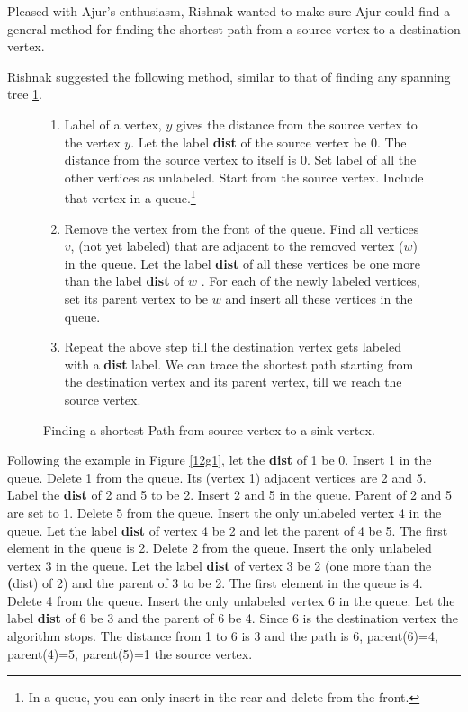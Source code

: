 Pleased with Ajur's enthusiasm, Rishnak wanted to make sure Ajur could find a general method for finding the shortest path from a source vertex to a destination vertex.

Rishnak suggested the following method, similar to that of finding any spanning tree \ref{12a1}.

\begin{figure} 
\begin{enumerate}
\item  Label of a vertex, $y$ gives the distance from the source vertex to the vertex $y$.  Let the label \textbf{dist} of the source vertex be 0. The distance from the source vertex to itself is 0. Set label of all the other vertices as unlabeled. Start from the source vertex. Include that vertex in a queue.\footnote{ In a queue, you can only insert in the rear and delete from the front.} 
\item Remove the vertex from the front of the queue. Find all vertices $v$, (not yet labeled) that are adjacent to the removed vertex ($w$) in the queue. Let the label \textbf{dist} of all these vertices be one more than the label \textbf{dist} of $w$ . For each of the newly labeled vertices, set its parent vertex to be $w$ and insert all these vertices in the queue.
\item Repeat the above step till the destination vertex gets labeled with a \textbf{dist} label. We can trace the shortest path starting from the destination vertex and its parent vertex, till we reach the source vertex.
\end{enumerate}
\caption{Finding a shortest Path from source vertex to a sink vertex.}\label{12a1}
\end{figure}

Following the example in Figure \ref{12g1}, let the \textbf{dist} of 1 be 0. Insert 1 in the queue. Delete 1 from the queue. Its (vertex 1) adjacent vertices are 2 and 5. Label the \textbf{dist} of 2 and 5 to be 2. Insert 2 and 5 in the queue. Parent of 2 and 5 are set  to 1. Delete 5 from the queue. Insert the only unlabeled vertex 4 in the queue. Let the label \textbf{dist} of vertex 4 be 2 and let the parent of 4 be 5. The first element in the queue is 2. Delete 2 from the queue. Insert the only unlabeled vertex 3 in the queue.  Let the label \textbf{dist} of vertex 3 be 2 (one more than the \textbf(dist) of 2) and the parent of 3 to be 2. The first element in the queue is 4. Delete 4 from the queue. Insert the only unlabeled vertex 6 in the queue. Let the label \textbf{dist} of 6 be 3 and the parent of 6 be 4. Since 6 is the destination vertex the algorithm stops. The distance from 1 to 6 is 3 and the path is 6, parent(6)=4, parent(4)=5, parent(5)=1 the source vertex.

